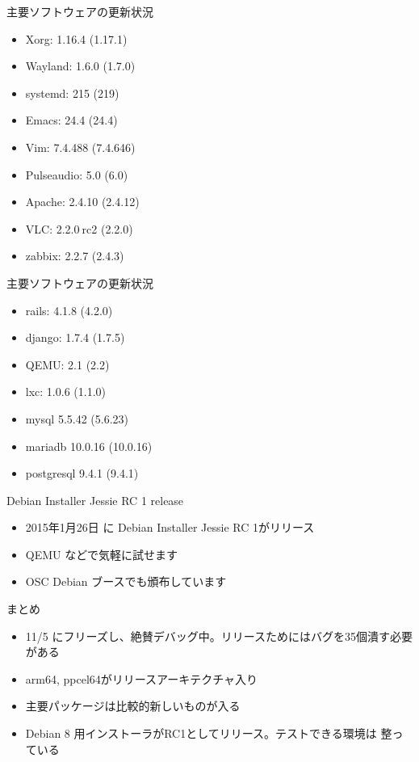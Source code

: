 \begin{frame}{主要ソフトウェアの更新状況}
\begin{itemize}
\item Xorg: 1.16.4 (1.17.1)
\item Wayland: 1.6.0 (1.7.0)
\item systemd: 215 (219)
\item Emacs: 24.4 (24.4)
\item Vim: 7.4.488 (7.4.646)
\item Pulseaudio: 5.0 (6.0)
\item Apache: 2.4.10 (2.4.12)
\item VLC: 2.2.0$~$rc2 (2.2.0) 
\item zabbix: 2.2.7 (2.4.3)
\end{itemize}

\end{frame}

\begin{frame}{主要ソフトウェアの更新状況}
\begin{itemize}
\item rails: 4.1.8 (4.2.0)
\item django: 1.7.4 (1.7.5)
\item QEMU: 2.1 (2.2)
\item lxc: 1.0.6 (1.1.0)
\item mysql 5.5.42 (5.6.23)
\item mariadb 10.0.16 (10.0.16)
\item postgresql 9.4.1 (9.4.1)
\end{itemize}

\end{frame}
\begin{frame}[containsverbatim]{Debian Installer Jessie RC 1 release}
\begin{itemize}
\item 2015年1月26日 に Debian Installer Jessie RC 1がリリース
\item QEMU などで気軽に試せます
\item OSC Debian ブースでも頒布しています
\end{itemize}
\end{frame}

\begin{frame}{まとめ}
\begin{itemize}
\item 11/5
にフリーズし、絶賛デバッグ中。リリースためにはバグを35個潰す必要がある
\item arm64, ppcel64がリリースアーキテクチャ入り
\item 主要パッケージは比較的新しいものが入る
\item Debian 8 用インストーラがRC1としてリリース。テストできる環境は
整っている
\end{itemize}
\end{frame}

